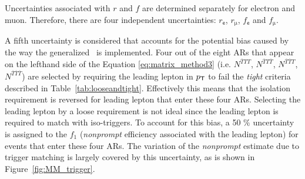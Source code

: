 Uncertainties associated with $r$ and $f$ are determined separately for electron and muon. Therefore, there are four independent uncertainties: $r_{\textsf{e}}$, $r_{\upmu}$, $f_{\textsf{e}}$ and $f_{\upmu}$. 

A fifth uncertainty is considered that accounts for the potential bias caused by the way the generalized \mm~is implemented. Four out of the eight \acp{AR} that appear on the lefthand side of the Equation \ref{eq:matrix_method3} (i.e. $N^{\overline{T}TT}$, $N^{\overline{T}T\overline{T}}$, $N^{\overline{T}\overline{T}T}$, $N^{\overline{T}\overline{T}\overline{T}}$) are selected by requiring the leading lepton in $p_{\textsf{T}}$ to fail the \emph{tight} criteria described in Table~\ref{tab:looseandtight}. Effectively this means that the isolation requirement is reversed for leading lepton that enter these four \acp{AR}. Selecting the leading lepton by a loose requirement is not ideal since the leading lepton is required to match with iso-triggers. To account for this bias, a 50 $\%$ uncertainty is assigned to the $f_1$ (\emph{nonprompt} efficiency associated with the leading lepton) for events that enter these four \acp{AR}. The variation of the \emph{nonprompt} estimate due to trigger matching is largely covered by this uncertainty, as is shown in Figure~\ref{fig:MM_trigger}.

